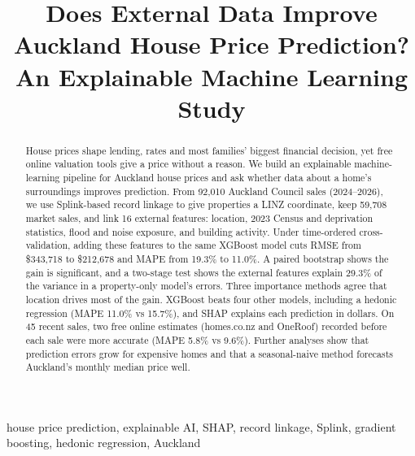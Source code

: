 \documentclass[conference]{IEEEtran}
\begin{document}

\title{Does External Data Improve Auckland House Price Prediction?
An Explainable Machine Learning Study}

\author{
}

\maketitle

\begin{abstract}
House prices shape lending, rates and most families' biggest financial
decision, yet free online valuation tools give a price without a
reason. We build an explainable machine-learning pipeline for Auckland
house prices and ask whether data about a home's surroundings improves
prediction. From 92,010 Auckland Council sales (2024--2026), we use
Splink-based record linkage to give properties a LINZ coordinate, keep
59,708 market sales, and link 16 external features:
location, 2023 Census and deprivation statistics, flood and noise
exposure, and building activity. Under time-ordered cross-validation,
adding these features to the same XGBoost model cuts
RMSE from \$343,718 to \$212,678 and MAPE from 19.3\% to 11.0\%. A
paired bootstrap shows the gain is significant, and a two-stage test
shows the external features explain 29.3\% of the variance in a
property-only model's errors. Three importance methods agree that
location drives most of the gain. XGBoost beats four other models,
including a hedonic regression (MAPE 11.0\% vs 15.7\%), and SHAP
explains each prediction in dollars. On 45 recent sales, two free online
estimates (homes.co.nz and OneRoof) recorded before each sale were more
accurate (MAPE 5.8\% vs 9.6\%). Further analyses show that prediction
errors grow for expensive homes and that a seasonal-naive method
forecasts Auckland's monthly median price well.
\end{abstract}

\begin{IEEEkeywords}
house price prediction, explainable AI, SHAP, record linkage, Splink,
gradient boosting, hedonic regression, Auckland
\end{IEEEkeywords}
\end{document}
